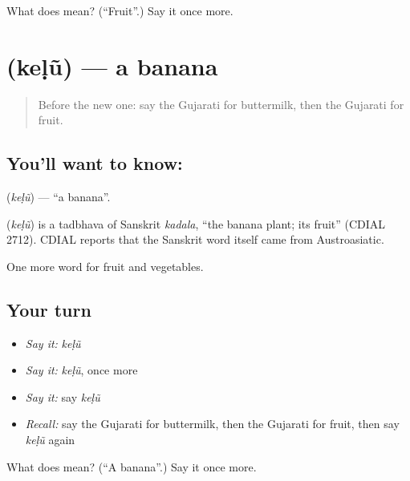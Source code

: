 \begin{tcolorbox}[breakable,colback=teal!4,colframe=teal!35!black,title={Before you move on}]
What does  mean? (\textquotedblleft{}Fruit\textquotedblright{}.) Say it once more.
\end{tcolorbox}
\section[\texorpdfstring{\gu{કેળું} (keḷũ)}{કેળું (keḷũ)}]{ (keḷũ) — a banana}

\label{lesson:GU-C59-banana}



\begin{quote}
Before the new one: say the Gujarati for buttermilk, then the Gujarati for fruit.
\end{quote}

\subsection*{You'll want to know: }
\textbf{} (\emph{keḷũ}) — \textquotedblleft{}a banana\textquotedblright{}.

\begin{cousinweb}
\textbf{} (\emph{keḷũ}) is a tadbhava of Sanskrit \emph{kadala}, \textquotedblleft{}the banana plant; its fruit\textquotedblright{} (CDIAL 2712). CDIAL reports that the Sanskrit word itself came from Austroasiatic.
\end{cousinweb}

\begin{grammarlens}[title={What you've built}]
One more word for fruit and vegetables.
\end{grammarlens}

\subsection*{Your turn}
\begin{itemize}
\raggedright
  \item \emph{Say it:} \emph{keḷũ}
  \item \emph{Say it:} \emph{keḷũ}, once more
  \item \emph{Say it:} say \emph{keḷũ}
  \item \emph{Recall:} say the Gujarati for buttermilk, then the Gujarati for fruit, then say \emph{keḷũ} again
\end{itemize}

\begin{tcolorbox}[breakable,colback=teal!4,colframe=teal!35!black,title={Before you move on}]
What does  mean? (\textquotedblleft{}A banana\textquotedblright{}.) Say it once more.
\end{tcolorbox}
